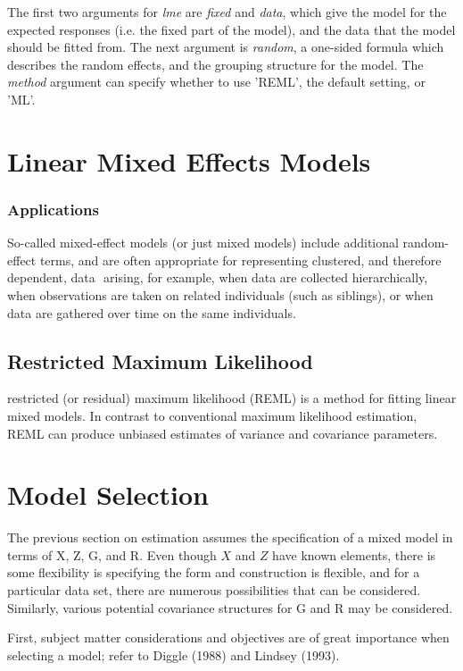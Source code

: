 \documentclass[12pt, a4paper]{report}
\theoremstyle{plain}
\theoremstyle{definition}
\theoremstyle{remark}
\begin{document}
The first two arguments for \emph{lme} are \emph{fixed} and
\emph{data}, which give the model for the expected responses (i.e.
the fixed part of the model), and the data that the model should
be fitted from. The next argument is  \emph{random}, a one-sided
formula which describes the random effects, and the grouping
structure for the model. The  \emph{method} argument can specify
whether to use 'REML', the default setting, or 'ML'.




\section{Linear Mixed Effects Models}
\subsubsection{Applications}
So-called mixed-effect models (or just mixed models) include
additional random-effect terms, and are often appropriate for
representing clustered, and therefore dependent, data  arising,
for example, when data are collected hierarchically, when
observations are taken on related individuals (such as siblings),
or when data are gathered over time on the same individuals.

\subsection{Restricted Maximum Likelihood}
restricted (or residual) maximum likelihood (REML) is a method for
fitting linear mixed models. In contrast to conventional maximum
likelihood estimation, REML can produce unbiased estimates of
variance and covariance parameters.




\section{Model Selection} The previous section on estimation assumes
the specification of a mixed model in terms of X, Z, G, and R.
Even though $X$ and $Z$ have known elements, there is some
flexibility is specifying the form and construction is flexible,
and for a particular data set, there are numerous possibilities
that can be considered. Similarly, various potential covariance
structures for G and R may be considered.

First, subject matter considerations and objectives are of great
importance when selecting a model; refer to Diggle (1988) and
Lindsey (1993).
\end{document}
